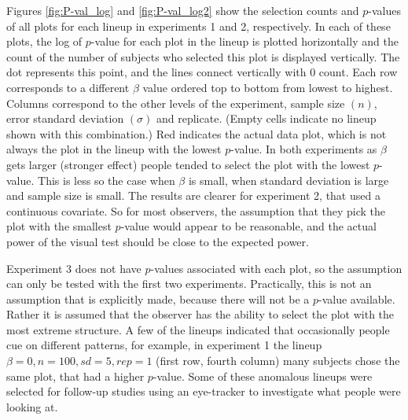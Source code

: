 \documentclass{article}
\begin{document}
Figures \ref{fig:P-val_log} and \ref{fig:P-val_log2} show the selection counts and $p$-values of all plots for each lineup in experiments 1 and 2, respectively. In each of these plots, the log of $p$-value for each plot in the lineup is plotted horizontally and the count of the number of subjects who selected this plot is displayed vertically. The dot represents this point, and the lines connect vertically with 0 count. Each row corresponds to a different $\beta$ value ordered top to bottom from lowest to highest. Columns correspond to the other levels of the experiment, sample size $(n)$, error standard deviation $(\sigma)$ and replicate. (Empty cells indicate no lineup shown with this combination.) Red indicates the actual data plot, which is not always the plot in the lineup with the lowest $p$-value. In both experiments as $\beta$ gets larger (stronger effect) people tended to select the plot with the lowest $p$-value. This is less so the case when $\beta$ is small, when standard deviation is large and sample size is small. The results are clearer for experiment 2, that used a continuous covariate. So for most observers, the assumption that they pick the plot with the smallest $p$-value would appear to be reasonable, and the actual power of the visual test should be close to the expected power.

Experiment 3 does not have $p$-values associated with each plot, so the assumption can only be tested with the first two experiments. Practically, this is not an assumption that is explicitly made, because there will not be a $p$-value available. Rather it is assumed that the observer has the ability to select the plot with the most extreme structure. A few of the lineups indicated that occasionally people cue on different patterns, for example, in experiment 1 the lineup $\beta=0, n=100, sd=5, rep=1$ (first row, fourth column) many subjects chose the same plot, that had a higher $p$-value. Some of these anomalous lineups were selected for follow-up studies using an eye-tracker to investigate what people were looking at.

\end{document}

